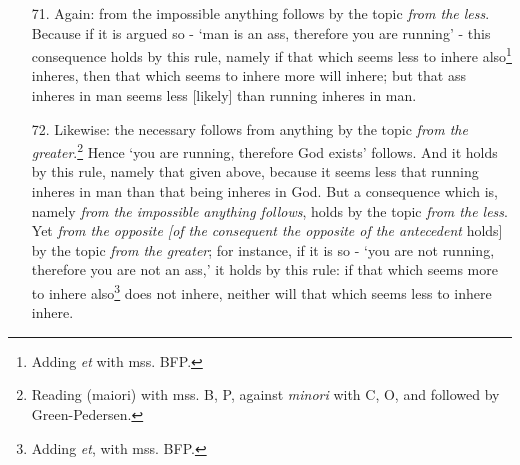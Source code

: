 \documentclass[]{article}
\begin{document}
\begin{itemize}
\item[71.] Again: from the impossible anything follows by the topic \textit{from the less}. Because if it is argued so - `man is an ass, therefore you are running' - this consequence holds by this rule, namely if that which seems less to inhere also\footnote{Adding \textit{et} with mss. BFP.} inheres, then that which seems to inhere more will inhere; but that ass inheres in man seems less [likely] than running inheres in man.
\item[72.] Likewise: the necessary follows from anything by the topic \textit{from the greater}.\footnote{Reading (maiori) with mss. B, P, against \textit{minori} with C, O, and followed by Green-Pedersen.} Hence `you are running, therefore God exists' follows. And it holds by this rule, namely that given above, because it seems less that running inheres in man than that being inheres in God. But a consequence which is, namely \textit{from the impossible anything follows}, holds by the topic \textit{from the less}. Yet \textit{from the opposite [of the consequent the opposite of the antecedent} holds] by the topic \textit{from the greater}; for instance, if it is so - `you are not running, therefore you are not an ass,' it holds by this rule: if that which seems more to inhere also\footnote{Adding \textit{et}, with mss. BFP.} does not inhere, neither will that which seems less to inhere inhere.
\end{itemize}
\end{document}
